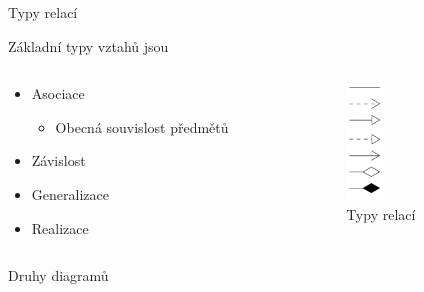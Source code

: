 \begin{frame}{Typy relací}

\onslide<+-> Základní typy vztahů jsou
\bigskip

\begin{columns}[T]

	\begin{column}{0.5\textwidth}
		\begin{itemize}
			\item<+-> Asociace
			\onslide<+->
			\begin{itemize}
				\item Obecná souvislost předmětů
			\end{itemize}
			\item<+-> Závislost
			\item<+-> Generalizace
			\item<+-> Realizace
		\end{itemize}
	\end{column}

	\begin{column}{0.5\textwidth}
		\begin{flushleft}
		\begin{figure}
			\includegraphics[width=10mm]{img/relace/relace.png}
			\caption{Typy relací}
		\end{figure}
		\end{flushleft}
	\end{column}

\end{columns}	

\end{frame}


\begin{frame}{Druhy diagramů}


	
\end{frame}

